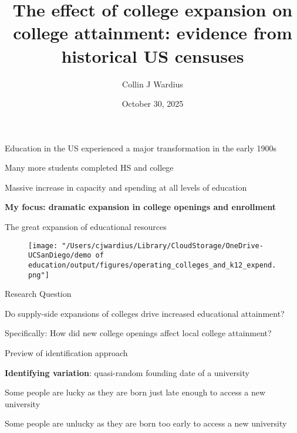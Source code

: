 \documentclass[notes,11pt, aspectratio=169]{beamer}
\title[]{The effect of college expansion on college attainment: evidence from historical US censuses}
\author{Collin J Wardius} %
\institute{
  Department of Economics, UC San Diego
  \newline
  Approved by
}
\date[]{October 30, 2025}
\newenvironment{wideitemize}{\itemize\addtolength{\itemsep}{10pt}}{\enditemize}
\begin{document}
\begin{frame}
  \titlepage
\end{frame}

\begin{frame}{Education in the US experienced a major transformation in the early 1900s}
 \begin{wideitemize}
\item Many more students completed HS and college
\item Massive increase in capacity and spending at all levels of education
\item \textbf{My focus: dramatic expansion in college openings and enrollment}
\end{wideitemize}
\end{frame}

\begin{frame}{The great expansion of educational resources}
  \begin{figure}
        \centering
        \texttt{[image: "/Users/cjwardius/Library/CloudStorage/OneDrive-UCSanDiego/demo of education/output/figures/operating\_colleges\_and\_k12\_expend.png"]}
        
    \end{figure}
\end{frame}

\begin{frame}{Research Question}
\begin{wideitemize}
\item Do supply-side expansions of colleges drive increased educational attainment?
\item Specifically: How did new college openings affect local college attainment?
\end{wideitemize}
\end{frame}

\begin{frame}{Preview of identification approach}
  \begin{wideitemize}
    \item \textbf{Identifying variation}: quasi-random founding date of a university
    \item Some people are lucky as they are born just late enough to access a new university
    \item Some people are unlucky as they are born too early to access a new university
  \end{wideitemize}
\end{frame}
\end{document}
